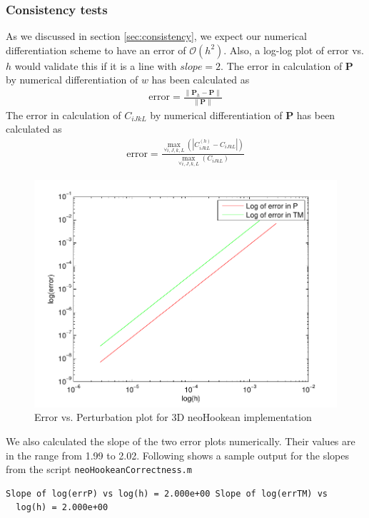 \documentclass[../main.tex]{subfiles}
\begin{document}
\subsubsection{Consistency tests}
As we discussed in section \ref{sec:consistency}, we expect our
numerical differentiation scheme to have an error of
$\mathcal{O}(h^2)$. Also, a log-log plot of $\text{error}$ vs. $h$
would validate this if it is a line with $slope=2$. The error in
calculation of $\mathbf{P}$ by numerical differentiation of $w$ has
been calculated as
\begin{align*}
  \text{error} = \frac{\lVert\mathbf{P}_h - \mathbf{P}\rVert}{\lVert\mathbf{P}\rVert}
\end{align*}
The error in calculation of $C_{iJkL}$ by numerical differentiation of
$\mathbf{P}$ has been calculated as
\begin{align*}
  \text{error} =\frac{\underset{\forall i,J,k,L}{\max}\left(|C^{(h)}_{iJkL}-C_{iJkL}|\right)}{\underset{\forall i,J,k,L}{\max}\left(C_{iJkL}\right)}
\end{align*}
\begin{figure}[h]
  \centering
  \includegraphics{./img/neoHookConsistency.pdf}
  \caption{Error vs. Perturbation plot for 3D neoHookean
    implementation}
  \label{fig:neoHcon}
\end{figure}
We also calculated the slope of the two error plots numerically. Their
values are in the range from 1.99 to 2.02. Following shows a sample
output for the slopes from the script \texttt{neoHookeanCorrectness.m}
\begin{lstlisting}[frame=single]
  Slope of log(errP) vs log(h) = 2.000e+00 Slope of log(errTM) vs
  log(h) = 2.000e+00
\end{lstlisting}
\end{document}
